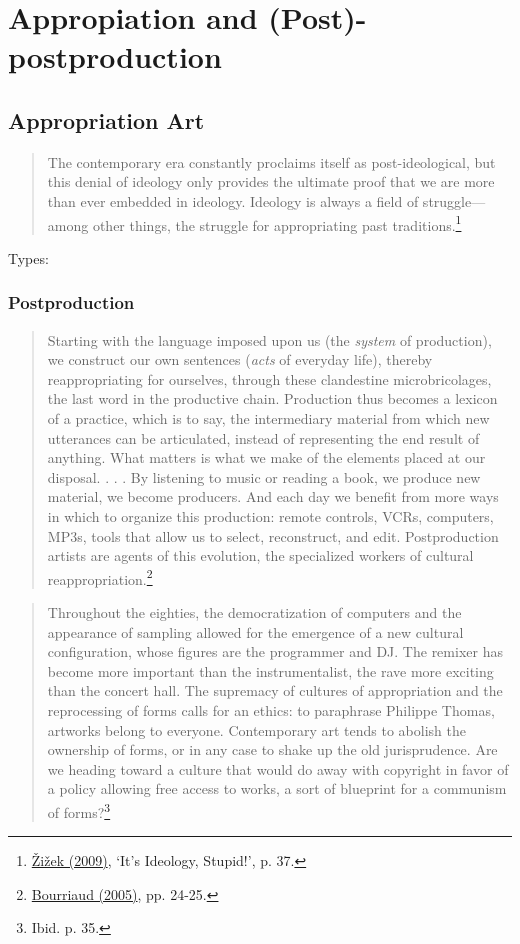 \hypertarget{chapter5}{}
\chapter{Appropiation and (Post)-postproduction}

\section{Appropriation Art}

\begin{quote}
The contemporary era constantly proclaims itself as post-ideological, but this denial of ideology only provides the ultimate proof that we are more than ever embedded in ideology. Ideology is always a field of struggle---among other things, the struggle for appropriating past traditions.\footnote{\hyperlink{zizektragedy}{\v{Z}i\v{z}ek (2009)}, `It's Ideology, Stupid!', p. 37.}
\end{quote}

Types:

\subsection {Postproduction}

\begin{quote}
Starting with the language imposed upon us (the \emph{system} of production), we construct our own sentences (\emph{acts} of everyday life), thereby reappropriating for ourselves, through these clandestine microbricolages, the last word in the productive chain. Production thus becomes a lexicon of a practice, which is to say, the intermediary material from which new utterances can be articulated, instead of representing the end result of anything. What matters is what we make of the elements placed at our disposal. . . . By listening to music or reading a book, we produce new material, we become producers. And each day we benefit from more ways in which to organize this production: remote controls, VCRs, computers, MP3s, tools that allow us to select, reconstruct, and edit. Postproduction artists are agents of this evolution, the specialized workers of cultural reappropriation.\footnote{\hyperlink{postproduction}{Bourriaud (2005)}, pp. 24-25.}
\end{quote}

\begin{quote}
Throughout the eighties, the democratization of computers and the appearance of sampling allowed for the emergence of a new cultural configuration, whose figures are the programmer and DJ. The remixer has become more important than the instrumentalist, the rave more exciting than the concert hall. The supremacy of cultures of appropriation and the reprocessing of forms calls for an ethics: to paraphrase Philippe Thomas, artworks belong to everyone. Contemporary art tends to abolish the ownership of forms, or in any case to shake up the old jurisprudence. Are we heading toward a culture that would do away with copyright in favor of a policy allowing free access to works, a sort of blueprint for a communism of forms?\footnote{Ibid. p. 35.}
\end{quote}

